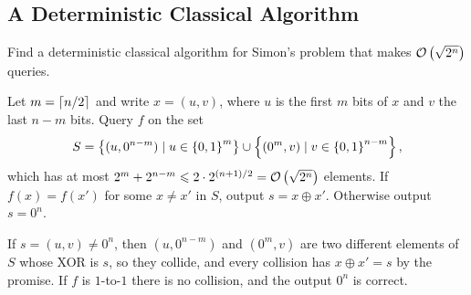 \subsection{A Deterministic Classical Algorithm}

\begin{exercisebox}
\begin{exercise}\label{ex:simon-det-0929}
    Find a deterministic classical algorithm for Simon's problem that makes $\mathcal{O}\left(\sqrt{2^n}\right)$ queries.
\end{exercise}
\tcblower
\begin{wsolution}
%
%
%
%
    Let $m = \left\lceil n/2\right\rceil$ and write $x = (u, v)$, where $u$ is the first $m$ bits of $x$ and $v$ the
    last $n - m$ bits. Query $f$ on the set
    \[S = \left\lbrace(u, 0^{n-m}) \mid u \in \left\lbrace0,1\right\rbrace^m\right\rbrace \cup \left\lbrace(0^m, v) \mid v \in \left\lbrace0,1\right\rbrace^{n-m}\right\rbrace,\]
    which has at most $2^m + 2^{n-m} \leqslant 2 \cdot 2^{(n+1)/2} = \mathcal{O}\left(\sqrt{2^n}\right)$ elements. If
    $f(x) = f(x')$ for some $x \neq x'$ in $S$, output $s = x \oplus x'$. Otherwise output $s = 0^n$.

    If $s = (u, v) \neq 0^n$, then $(u, 0^{n-m})$ and $(0^m, v)$ are two different elements of $S$
    whose XOR is $s$, so they collide, and every collision has $x \oplus x' = s$ by the promise. If
    $f$ is $1$-to-$1$ there is no collision, and the output $0^n$ is correct.
\end{wsolution}
\end{exercisebox}
